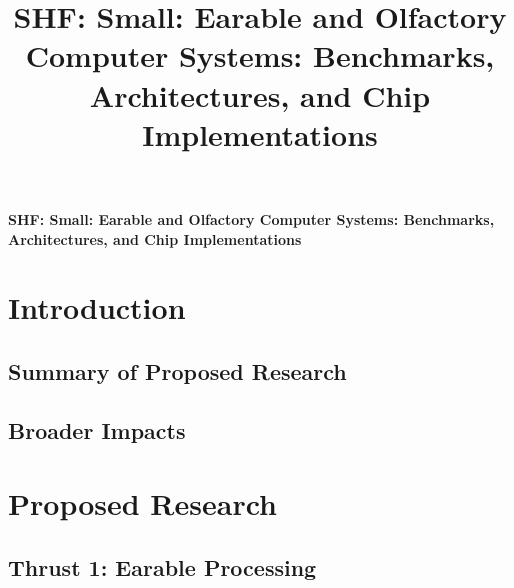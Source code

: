 \documentclass[11 pt]{article}
\title{SHF: Small: Earable and Olfactory Computer Systems: Benchmarks, Architectures, and Chip Implementations}
\begin{document}
\begin{center}
{\Large \textbf{SHF: Small: Earable and Olfactory Computer Systems: Benchmarks, Architectures, and Chip Implementations}}
\end{center}

\section{Introduction}


\subsection{Summary of Proposed Research}
\label{ssec:summary}


\subsection{Broader Impacts}


%

\section{Proposed Research}


\subsection{Thrust 1: Earable Processing}
\label{ssec:research1}

\end{document}

